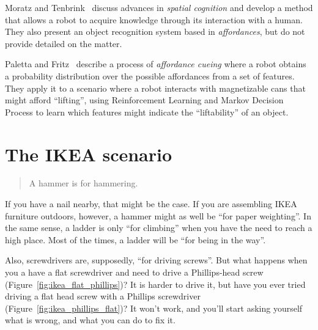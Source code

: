\documentclass{article}
\begin{document}
Moratz and Tenbrink~\cite{moratz2008} discuss advances in \emph{spatial
cognition} and develop a method that allows a robot to acquire knowledge through
its interaction with a human. They also present an object recognition system
based in \emph{affordances}, but do not provide detailed on the matter.

Paletta and Fritz~\cite{paletta2008} describe a process of \emph{affordance
cueing} where a robot obtains a probability distribution over the possible
affordances from a set of features. They apply it to a scenario where a robot
interacts with magnetizable cans that might afford ``lifting'', using
Reinforcement Learning and Markov Decision Process to learn which features
might indicate the ``liftability'' of an object.


\section{The IKEA scenario}

\begin{quotation}
  A hammer is for hammering.
\end{quotation}

If you have a nail nearby, that might be the case. If you are assembling IKEA
furniture outdoors, however, a hammer might as well be ``for paper weighting''.
In the same sense, a ladder is only ``for climbing'' when you have the need to
reach a high place. Most of the times, a ladder will be
``for being in the way''.

Also, screwdrivers are, supposedly, ``for driving screws''. But what happens
when you a have a flat screwdriver and need to drive a Phillips-head screw
(Figure~\ref{fig:ikea_flat_phillips})? It is harder to drive it, but have you
ever tried driving a flat head screw with a Phillips screwdriver
(Figure~\ref{fig:ikea_phillips_flat})? It won't work, and you'll start asking
yourself what is wrong, and what you can do to fix it.
\end{document}

